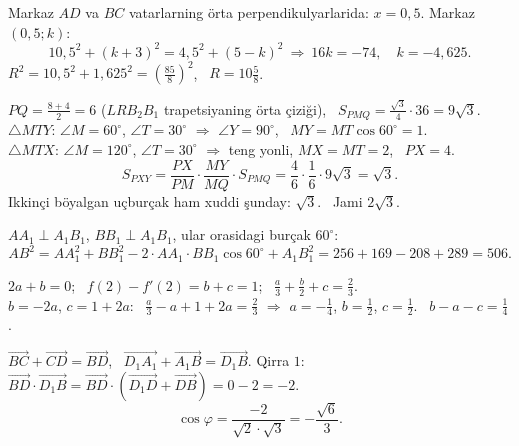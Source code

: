 Markaz $AD$ va $BC$ vatarlarning örta perpendikulyarlarida: $x=0{,}5$. Markaz $(0{,}5;k)$:
\[10{,}5^2+(k+3)^2=4{,}5^2+(5-k)^2\ \Rightarrow\ 16k=-74,\quad k=-4{,}625.\]
$R^2=10{,}5^2+1{,}625^2=\left(\frac{85}8\right)^2$, \ $R=10\frac58$.

\newpage
{}
$PQ=\frac{8+4}2=6$ ($LRB_2B_1$ trapetsiyaning örta çiziği), \ $S_{PMQ}=\frac{\sqrt3}4\cdot36=9\sqrt3$.\\
$\triangle MTY$: $\angle M=60^\circ$, $\angle T=30^\circ$ $\Rightarrow$ $\angle Y=90^\circ$, \ $MY=MT\cos60^\circ=1$.\\
$\triangle MTX$: $\angle M=120^\circ$, $\angle T=30^\circ$ $\Rightarrow$ teng yonli, $MX=MT=2$, \ $PX=4$.
\[S_{PXY}=\frac{PX}{PM}\cdot\frac{MY}{MQ}\cdot S_{PMQ}=\frac46\cdot\frac16\cdot9\sqrt3=\sqrt3.\]
Ikkinçi böyalgan uçburçak ham xuddi şunday: $\sqrt3$. \ Jami $2\sqrt3$.

$AA_1\perp A_1B_1$, $BB_1\perp A_1B_1$, ular orasidagi burçak $60^\circ$:
\[AB^2=AA_1^2+BB_1^2-2\cdot AA_1\cdot BB_1\cos60^\circ+A_1B_1^2=256+169-208+289=506.\]

$2a+b=0$; \ $f(2)-f'(2)=b+c=1$; \ $\frac a3+\frac b2+c=\frac23$.\\
$b=-2a$, $c=1+2a$: \ $\frac a3-a+1+2a=\frac23$ $\Rightarrow$ $a=-\frac14$, $b=\frac12$, $c=\frac12$. \ $b-a-c=\frac14$.

$\overrightarrow{BC}+\overrightarrow{CD}=\overrightarrow{BD}$, \ $\overrightarrow{D_1A_1}+\overrightarrow{A_1B}=\overrightarrow{D_1B}$. Qirra $1$: $\overrightarrow{BD}\cdot\overrightarrow{D_1B}=\overrightarrow{BD}\cdot\left(\overrightarrow{D_1D}+\overrightarrow{DB}\right)=0-2=-2$.
\[\cos\varphi=\frac{-2}{\sqrt2\cdot\sqrt3}=-\frac{\sqrt6}3.\]

